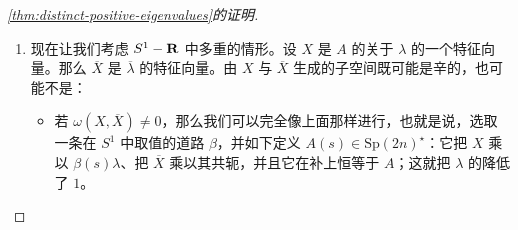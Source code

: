 \begin{proof}[\cref{thm:distinct-positive-eigenvalues}的证明]
\begin{enumerate}[label=(\arabic*)]
设 $\beta:[0,\varepsilon]\to\CC^\star$ 是一条类 $\cC^\infty$ 的、以 $1$ 为起点的道路。对 $s\in[0,\varepsilon]$，我们如下定义 $A(s)$：
\[
\begin{aligned}
A(s)(X)&=\beta(s)\lambda X\text{，} & A(s)(\overline{X})&=\overline{\beta}(s)\overline{\lambda}\,\overline{X}\text{，}\\
A(s)(Y)&=\frac{1}{\beta(s)\lambda}\,Y\text{，} & A(s)(\overline{Y})&=\frac{1}{\overline{\beta}(s)\overline{\lambda}}\,\overline{Y}
\end{aligned}
\]
并且 $A(s)$ 在 $F$ 的\trSymplectic{}\trOrthogonal{}补 $F^\circ$ 上等于 $A$。容易验证 $A(s)$ 是实的、\trSymplectic{}的。我们有
\[
\left\{\begin{array}{ll}
A(s)|_{E_\mu}=A|_{E_\mu} & \text{对 }\mu\notin\{\lambda,1/\lambda,\overline{\lambda},1/\overline{\lambda}\}\text{，}\\
A(s)|_{E_\mu\cap F^\circ}=A|_{E_\mu\cap F^\circ} & \text{对 }\mu\in\{\lambda,1/\lambda,\overline{\lambda},1/\overline{\lambda}\}
\end{array}\right.
\]
（对充分小的 $s$）。因此，通过恰当地选取 $\beta$，对充分小的 $s$ 我们将有 $\beta(s)\lambda\in\CC-(S^1\cup\RR)$，$A(s)\in\mathrm{Sp}(2n)^\star$。此外，
\[
\dim_\CC E_\mu(A(s))=\left\{
\begin{array}{l@{\hspace{6pt}}l}
\dim_\CC E_\mu(A) & \text{若 }\mu\in\operatorname{Spec}(A)\text{ 且 }\mu\notin\{\lambda,1/\lambda,\overline{\lambda},1/\overline{\lambda}\}\\
\dim_\CC E_\mu(A)-1 & \text{若 }\mu\in\{\lambda,1/\lambda,\overline{\lambda},1/\overline{\lambda}\}\\
1 & \text{若 }\mu\in\{\beta\lambda,\,1/\beta\lambda,\,\overline{\beta\lambda},\,1/\overline{\beta\lambda}\}
\end{array}\right.\text{，}
\]
于是我们把 $\lambda$ 的\trMultiplicity{}降低了 $1$，而没有增大其他\trEigenvalue{}的\trMultiplicity。
\item 现在让我们考虑 $S^1-\mathbf{R}$ 中多重\trEigenvalue{}的情形。设 $X$ 是 $A$ 的关于\trEigenvalue{} $\lambda$ 的一个特征向量。那么 $\overline{X}$ 是 $\overline{\lambda}$ 的特征向量。由 $X$ 与 $\overline{X}$ 生成的子空间既可能是辛的，也可能不是：
  \begin{itemize}
  \item 若 $\omega(X,\overline{X})\neq0$，那么我们可以完全像上面那样进行，也就是说，选取一条在 $S^1$ 中取值的道路 $\beta$，并如下定义 $A(s)\in\mathrm{Sp}(2n)^\star$：它把 $X$ 乘以 $\beta(s)\lambda$、把 $\overline{X}$ 乘以其共轭，并且它在\trSymplectic{}\trOrthogonal{}补上恒等于 $A$；这就把\trEigenvalue{} $\lambda$ 的\trMultiplicity{}降低了 $1$。

\end{itemize}
\end{enumerate}
\end{proof}
